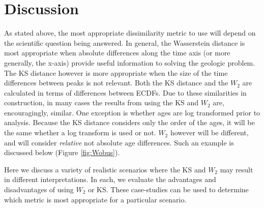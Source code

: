 \documentclass[gchron, manuscript]{article}
\begin{document}

\section{Discussion}

As stated above, the most appropriate dissimilarity metric to use will depend on the scientific question being answered. In general, the Wasserstein distance is most appropriate when absolute differences along the time axis (or more generally, the x-axis) provide useful information to solving the geologic problem. The KS distance however is more appropriate when the size of the time differences between peaks is not relevant. Both the KS distance and the $W_2$ are calculated in terms of differences between ECDFs. Due to these similarities in construction, in many cases the results from using the KS and $W_2$ are, encouragingly, similar. One exception is whether ages are log transformed prior to analysis. Because the KS distance considers only the order of the ages, it will be the same whether a log transform is used or not. $W_2$ however will be different, and will consider \textit{relative} not absolute age differences.  Such an example is discussed below (Figure \ref{fig:Wobus}). 

Here we discuss a variety of realistic scenarios where the KS and $W_2$ may result in different interpretations. In each, we evaluate the advantages and disadvantages of using $W_2$ or KS. These case-studies can be used to determine which metric is most appropriate for a particular scenario. 
\end{document}
